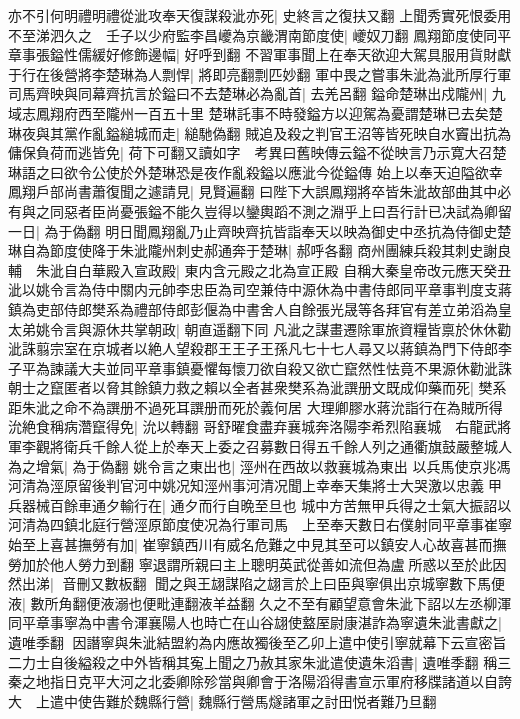 亦不引何明禮明禮從泚攻奉天復謀殺泚亦死|{
	史終言之復扶又翻}
上聞秀實死恨委用不至涕泗久之　壬子以少府監李昌巙為京畿渭南節度使|{
	巙奴刀翻}
鳳翔節度使同平章事張鎰性儒緩好修飾邊幅|{
	好呼到翻}
不習軍事聞上在奉天欲迎大駕具服用貨財獻于行在後營將李楚琳為人剽悍|{
	將即亮翻剽匹妙翻}
軍中畏之嘗事朱泚為泚所厚行軍司馬齊映與同幕齊抗言於鎰曰不去楚琳必為亂首|{
	去羌呂翻}
鎰命楚琳出戍隴州|{
	九域志鳳翔府西至隴州一百五十里}
楚琳託事不時發鎰方以迎駕為憂謂楚琳已去矣楚琳夜與其黨作亂鎰縋城而走|{
	縋馳偽翻}
賊追及殺之判官王沼等皆死映自水竇出抗為傭保負荷而逃皆免|{
	荷下可翻又讀如字　考異曰舊映傳云鎰不從映言乃示寛大召楚琳語之曰欲令公使於外楚琳恐是夜作亂殺鎰以應泚今從鎰傳}
始上以奉天迫隘欲幸鳳翔戶部尚書蕭復聞之遽請見|{
	見賢遍翻}
曰陛下大誤鳳翔將卒皆朱泚故部曲其中必有與之同惡者臣尚憂張鎰不能久豈得以鑾輿蹈不測之淵乎上曰吾行計已决試為卿留一日|{
	為于偽翻}
明日聞鳳翔亂乃止齊映齊抗皆詣奉天以映為御史中丞抗為侍御史楚琳自為節度使降于朱泚隴州刺史郝通奔于楚琳|{
	郝呼各翻}
商州團練兵殺其刺史謝良輔　朱泚自白華殿入宣政殿|{
	東内含元殿之北為宣正殿}
自稱大秦皇帝改元應天癸丑泚以姚令言為侍中關内元帥李忠臣為司空兼侍中源休為中書侍郎同平章事判度支蔣鎮為吏部侍郎樊系為禮部侍郎彭偃為中書舍人自餘張光晟等各拜官有差立弟滔為皇太弟姚令言與源休共掌朝政|{
	朝直遥翻下同}
凡泚之謀畫遷除軍旅資糧皆禀於休休勸泚誅翦宗室在京城者以絶人望殺郡王王子王孫凡七十七人尋又以蔣鎮為門下侍郎李子平為諫議大夫並同平章事鎮憂懼每懷刀欲自殺又欲亡竄然性怯竟不果源休勸泚誅朝士之竄匿者以脅其餘鎮力救之賴以全者甚衆樊系為泚譔册文既成仰藥而死|{
	樊系距朱泚之命不為譔册不過死耳譔册而死於義何居}
大理卿膠水蔣沇詣行在為賊所得沇絶食稱病濳竄得免|{
	沇以轉翻}
哥舒曜食盡弃襄城奔洛陽李希烈陷襄城　右龍武將軍李觀將衛兵千餘人從上於奉天上委之召募數日得五千餘人列之通衢旗鼓嚴整城人為之增氣|{
	為于偽翻}
姚令言之東出也|{
	涇州在西故以救襄城為東出}
以兵馬使京兆馮河清為涇原留後判官河中姚况知涇州事河清况聞上幸奉天集將士大哭激以忠義甲兵器械百餘車通夕輸行在|{
	通夕而行自晩至旦也}
城中方苦無甲兵得之士氣大振詔以河清為四鎮北庭行營涇原節度使况為行軍司馬　上至奉天數日右僕射同平章事崔寧始至上喜甚撫勞有加|{
	崔寧鎮西川有威名危難之中見其至可以鎮安人心故喜甚而撫勞加於他人勞力到翻}
寧退謂所親曰主上聰明英武從善如流但為盧所惑以至於此因然出涕|{
	音刪又數板翻}
聞之與王翃謀陷之翃言於上曰臣與寧俱出京城寧數下馬便液|{
	數所角翻便液溺也便毗連翻液羊益翻}
久之不至有顧望意會朱泚下詔以左丞柳渾同平章事寧為中書令渾襄陽人也時亡在山谷翃使盩厔尉康湛詐為寧遺朱泚書獻之|{
	遺唯季翻}
因譖寧與朱泚結盟約為内應故獨後至乙卯上遣中使引寧就幕下云宣密旨二力士自後縊殺之中外皆稱其寃上聞之乃赦其家朱泚遣使遺朱滔書|{
	遺唯季翻}
稱三秦之地指日克平大河之北委卿除殄當與卿會于洛陽滔得書宣示軍府移牒諸道以自誇大　上遣中使告難於魏縣行營|{
	魏縣行營馬燧諸軍之討田悦者難乃旦翻}
